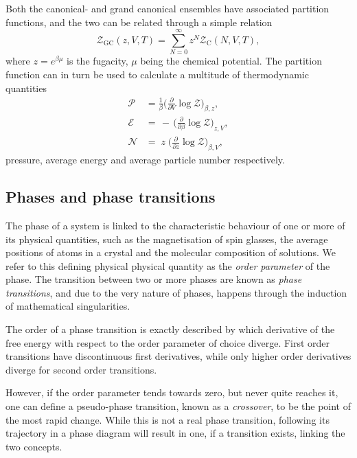 Both the canonical- and grand canonical ensembles have associated partition
functions, and the two can be related through a simple relation
%
\begin{equation}
  \mathcal{Z}_{\text{GC}}(z, V, T) = \sum_{N=0}^{\infty} z^N \mathcal{Z}_{\text{C}}(N, V, T),
\end{equation}
%
where $z = e^{\beta \mu}$ is the fugacity, $\mu$ being the chemical
potential. The partition function can in turn be used to calculate a multitude
of thermodynamic quantities
%
\begin{align}
  \mathcal{P} &= \frac{1}{\beta} \bigg( \frac{\partial}{\partial V} \log \mathcal{Z}
    \bigg)_{\beta,z}, \\
  \mathcal{E} &= \,\minus\, \bigg( \frac{\partial}{\partial \beta}
    \log \mathcal{Z} \bigg)_{z,V}, \\
  \mathcal{N} &= \;z\; \bigg( \frac{\partial}{\partial z}
    \log \mathcal{Z} \bigg)_{\beta,V},
\end{align}
%
pressure, average energy and average particle number respectively.

\subsection{Phases and phase transitions}

The phase of a system is linked to the characteristic behaviour of one or more
of its physical quantities, such as the magnetisation of spin glasses, the
average positions of atoms in a crystal and the molecular composition of
solutions. We refer to this defining physical physical quantity as the
\emph{order parameter} of the phase.  The transition between two or more phases
are known as \emph{phase transitions}, and due to the very nature of phases,
happens through the induction of mathematical singularities. 

The order of a phase transition is exactly described by which derivative of the
free energy with respect to the order parameter of choice diverge. First order
transitions have discontinuous first derivatives, while only higher order
derivatives diverge for second order transitions.

However, if the order parameter tends towards zero, but never quite reaches it,
one can define a pseudo-phase transition, known as a \emph{crossover}, to be the
point of the most rapid change. While this is not a real phase transition,
following its trajectory in a phase diagram will result in one, if a transition
exists, linking the two concepts.


